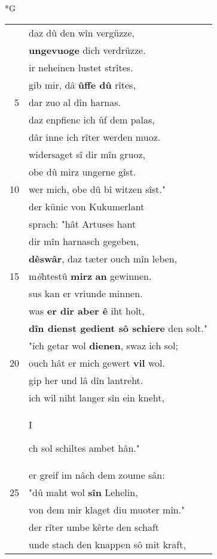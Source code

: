 \documentclass[8pt,a4paper,notitlepage]{article}
\begin{document}
\begin{table}[ht]
\begin{minipage}[t]{0.5\linewidth}
\small
\begin{center}*G
\end{center}
\begin{tabular}{rl}
 & daz dû den wîn vergüzze,\\ 
 & \textbf{ungevuoge} dich verdrüzze.\\ 
 & ir neheinen lustet strîtes.\\ 
 & gib mir, dâ \textbf{ûffe dû} rîtes,\\ 
5 & dar zuo al dîn harnas.\\ 
 & daz enpfienc ich ûf dem palas,\\ 
 & dâr inne ich rîter werden muoz.\\ 
 & widersaget sî dir mîn gruoz,\\ 
 & obe dû mirz ungerne gîst.\\ 
10 & wer mich, obe dû bî witzen sîst."\\ 
 & der künic von Kukumerlant\\ 
 & sprach: "hât Artuses hant\\ 
 & dir mîn harnasch gegeben,\\ 
 & \textbf{dêswâr}, daz tæter ouch mîn leben,\\ 
15 & m\textit{ö}htestû \textbf{mirz} \textbf{an} gewinnen.\\ 
 & sus kan er vriunde minnen.\\ 
 & was \textbf{er dir aber ê} iht holt,\\ 
 & \textbf{dîn dienst gedient sô schiere} den solt."\\ 
 & "ich getar wol \textbf{dienen}, swaz ich sol;\\ 
20 & ouch hât er mich gewert \textbf{vil} wol.\\ 
 & gip her und lâ dîn lantreht.\\ 
 & ich wil niht langer sîn ein kneht,\\ 
 & \begin{large}I\end{large}ch sol schiltes ambet hân."\\ 
 & er greif im nâch dem zoume sân:\\ 
25 & "dû maht wol \textbf{sîn} Lehelin,\\ 
 & von dem mir klaget diu muoter mîn."\\ 
 & der rîter umbe kêrte den schaft\\ 
 & unde stach den knappen sô mit kraft,\\ 

\end{tabular}
\end{minipage}
\end{table}
\end{document}
